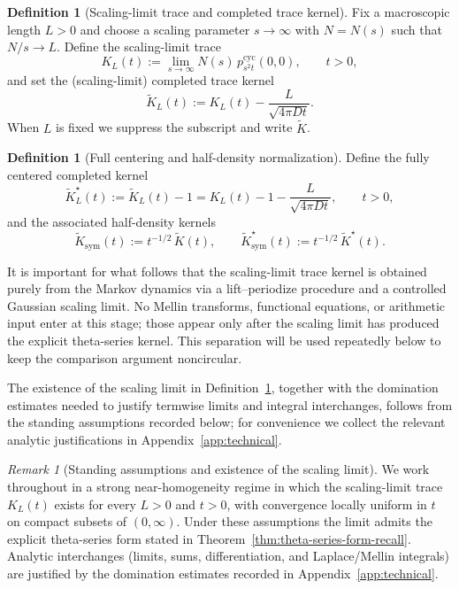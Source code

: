 \documentclass[11pt]{amsart}
\theoremstyle{definition}
\newtheorem{definition}[theorem]{Definition}
\theoremstyle{remark}
\newtheorem{remark}[theorem]{Remark}
\begin{document}
\begin{definition}[Scaling-limit trace and completed trace kernel]
\label{def:scaling-limit}
Fix a macroscopic length $L>0$ and choose a scaling parameter $s\to\infty$ with $N=N(s)$ such
that $N/s\to L$. Define the scaling-limit trace
\[
K_L(t):=\lim_{s\to\infty} N(s)\,p^{\mathrm{cyc}}_{s^2 t}(0,0),\qquad t>0,
\]
and set the (scaling-limit) completed trace kernel
\[
\widetilde K_L(t):=K_L(t)-\frac{L}{\sqrt{4\pi D t}}.
\]
When $L$ is fixed we suppress the subscript and write $\widetilde K$.
\end{definition}

\begin{definition}[Full centering and half-density normalization]
\label{def:half-density}
Define the fully centered completed kernel
\[
\widetilde K_L^{\star}(t):=\widetilde K_L(t)-1=K_L(t)-1-\frac{L}{\sqrt{4\pi D t}},\qquad t>0,
\]
and the associated half-density kernels
\[
\widetilde K_{\mathrm{sym}}(t):=t^{-1/2}\,\widetilde K(t),
\qquad
\widetilde K^{\star}_{\mathrm{sym}}(t):=t^{-1/2}\,\widetilde K^{\star}(t).
\]
\end{definition}

It is important for what follows that the scaling-limit trace kernel is obtained purely from the
Markov dynamics via a lift--periodize procedure and a controlled Gaussian scaling limit.
No Mellin transforms, functional equations, or arithmetic input enter at this stage; those appear only
after the scaling limit has produced the explicit theta-series kernel. This separation will be used
repeatedly below to keep the comparison argument noncircular.

The existence of the scaling limit in Definition~\ref{def:scaling-limit}, together with the
domination estimates needed to justify termwise limits and integral interchanges, follows from
the standing assumptions recorded below; for convenience we collect the relevant analytic
justifications in Appendix~\ref{app:technical}.

\begin{remark}[Standing assumptions and existence of the scaling limit]
\label{rem:standing-assumptions}
We work throughout in a strong near-homogeneity regime in which the scaling-limit trace $K_L(t)$
exists for every $L>0$ and $t>0$, with convergence locally uniform in $t$ on compact subsets of
$(0,\infty)$. Under these assumptions the limit admits the explicit theta-series form stated in
Theorem~\ref{thm:theta-series-form-recall}. Analytic interchanges (limits, sums, differentiation,
and Laplace/Mellin integrals) are justified by the domination estimates recorded in
Appendix~\ref{app:technical}.

\end{remark}
\end{document}
